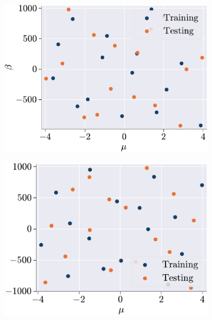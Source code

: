 \documentclass[11pt]{article}
\begin{document}
    \begin{figure}[t]
        \centering
        \begin{subfigure}[b]{0.45\linewidth}
            \centering
            \includegraphics[width=\linewidth]{param_list_L.pdf}
            \caption{}
            \label{fig:HFS_HC_a}
        \end{subfigure}
        \begin{subfigure}[b]{0.45\linewidth}
            \centering
            \includegraphics[width=0.98\linewidth]{param_list_NL.pdf}
            \caption{}
            \label{fig:HFS_HC_b}
        \end{subfigure}


\end{figure}
\end{document}
